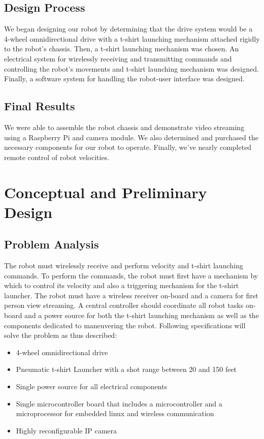 \documentclass[letterpaper,12pt]{article}
\begin{document}
\subsection{Design Process}
\noindent We began designing our robot by determining that the drive system would be a 4-wheel omnidirectional drive with a t-shirt launching mechanism attached rigidly to the robot's chassis. Then, a t-shirt launching mechanism was chosen. An electrical system for wirelessly receiving and transmitting commands and controlling the robot's movements and t-shirt launching mechanism was designed. Finally, a software system for handling the robot-user interface was designed. 

\subsection{Final Results}
\noindent We were able to assemble the robot chassis and demonstrate video streaming using a Raspberry Pi and camera module. We also determined and purchased the necessary components for our robot to operate. Finally, we've nearly completed remote control of robot velocities. 

\section{Conceptual and Preliminary Design}

\subsection{Problem Analysis}
\noindent The robot must wirelessly receive and perform velocity and t-shirt launching commands. To perform the commands, the robot must first have a mechanism by which to control its velocity and also a triggering mechanism for the t-shirt launcher. The robot must have a wireless receiver on-board and a camera for first person view streaming. A central controller should coordinate all robot tasks on-board and a power source for both the t-shirt launching mechanism as well as the components dedicated to maneuvering the robot. Following specifications will solve the problem as thus described:
\begin{itemize}
    \item 4-wheel omnidirectional drive
    \item Pneumatic t-shirt Launcher with a shot range between 20 and 150 feet
    \item Single power source for all electrical components
    \item Single microcontroller board that includes a microcontroller and a microprocessor for embedded linux and wireless communication
    \item Highly reconfigurable IP camera
\end{itemize}
\end{document}
